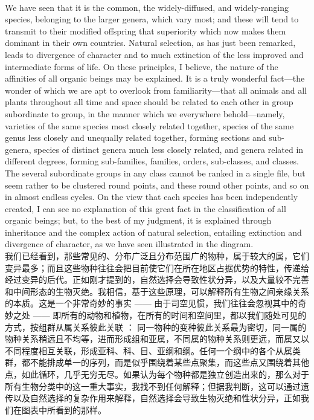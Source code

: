 \documentclass{article}
\begin{document}
\\
We have seen that it is the common, the widely-diffused, and widely-ranging species, belonging to the larger genera, which vary most; and these will tend to transmit to their modified offspring that superiority which now makes them dominant in their own countries. Natural selection, as has just been remarked, leads to divergence of character and to much extinction of the less improved and intermediate forms of life. On these principles, I believe, the nature of the affinities of all organic beings may be explained. It is a truly wonderful fact—the wonder of which we are apt to overlook from familiarity—that all animals and all plants throughout all time and space should be related to each other in group subordinate to group, in the manner which we everywhere behold—namely, varieties of the same species most closely related together, species of the same genus less closely and unequally related together, forming sections and sub-genera, species of distinct genera much less closely related, and genera related in different degrees, forming sub-families, families, orders, sub-classes, and classes. The several subordinate groups in any class cannot be ranked in a single file, but seem rather to be clustered round points, and these round other points, and so on in almost endless cycles. On the view that each species has been independently created, I can see no explanation of this great fact in the classification of all organic beings; but, to the best of my judgment, it is explained through inheritance and the complex action of natural selection, entailing extinction and divergence of character, as we have seen illustrated in the diagram.\\
我们已经看到，那些常见的、分布广泛且分布范围广的物种，属于较大的属，它们变异最多；而且这些物种往往会把目前使它们在所在地区占据优势的特性，传递给经过变异的后代。正如刚才提到的，自然选择会导致性状分异，以及大量较不完善和中间形态的生物灭绝。我相信，基于这些原理，可以解释所有生物之间亲缘关系的本质。这是一个非常奇妙的事实 —— 由于司空见惯，我们往往会忽视其中的奇妙之处 —— 即所有的动物和植物，在所有的时间和空间里，都以我们随处可见的方式，按组群从属关系彼此关联 ： 同一物种的变种彼此关系最为密切，同一属的物种关系稍远且不均等，进而形成组和亚属，不同属的物种关系则更远，而属又以不同程度相互关联，形成亚科、科、目、亚纲和纲。任何一个纲中的各个从属类群，都不能排成单一的序列，而是似乎围绕着某些点聚集，而这些点又围绕着其他点，如此循环，几乎无穷无尽。如果认为每个物种都是独立创造出来的，那么对于所有生物分类中的这一重大事实，我找不到任何解释；但据我判断，这可以通过遗传以及自然选择的复杂作用来解释，自然选择会导致生物灭绝和性状分异，正如我们在图表中所看到的那样。 \\
\end{document}
